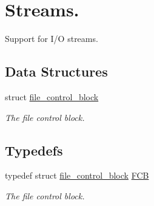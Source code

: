 \hypertarget{group__streams}{}\section{Streams.}
\label{group__streams}


Support for I/O streams.  


\subsection*{Data Structures}
\begin{DoxyCompactItemize}
\item 
struct \hyperlink{structfile__control__block}{file\+\_\+control\+\_\+block}
\begin{DoxyCompactList}\small\item\em The file control block. \end{DoxyCompactList}\end{DoxyCompactItemize}
\subsection*{Typedefs}
\begin{DoxyCompactItemize}
\item 
typedef struct \hyperlink{structfile__control__block}{file\+\_\+control\+\_\+block} \hyperlink{group__streams_ga0c7e751afb9d6cadebf070961804d400}{F\+CB}
\begin{DoxyCompactList}\small\item\em The file control block. \end{DoxyCompactList}\end{DoxyCompactItemize}
